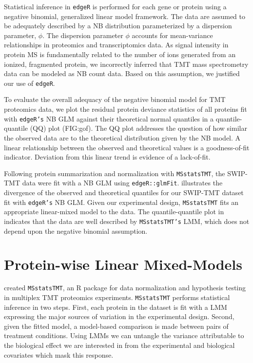 \documentclass[11pt]{elife}\usepackage[]{graphicx}\usepackage[]{color}
\begin{document}
Statistical inference in \texttt{edgeR} is performed for each gene or protein
using a negative binomial, generalized linear model framework.  The data are
assumed to be adequately described by a NB distribution parameterized by a
dispersion parameter, $\phi$. The dispersion parameter $\phi$ accounts for
mean-variance relationships in proteomics and transcriptomics data.  As signal
intensity in protein MS is fundamentally related to the number of ions generated
from an ionized, fragmented protein, we incorrectly inferred that TMT mass
spectrometry data can be modeled as NB count data. Based on this assumption, we
justified our use of \texttt{edgeR}.  

To evaluate the overall adequacy of the negative binomial model for TMT
proteomics data, we plot the residual protein deviance statistics of all
proteins fit with \texttt{edgeR's} NB GLM against their theoretical normal
quantiles in a quantile-quantile (QQ) plot (FIG:gof).  The QQ plot addresses the
question of how similar the observed data are to the theoretical distribution
given by the NB model.  A linear relationship between the observed and
theoretical values is a goodness-of-fit indicator.  Deviation from this linear
trend is evidence of a lack-of-fit.

Following protein summarization and normalization with \texttt{MSstatsTMT}, the
SWIP-TMT data were fit with a NB GLM using \texttt{edgeR::glmFit}. 
illustrates the divergence of the observed and theoretical quantiles for our
SWIP-TMT dataset fit with \texttt{edgeR's} NB GLM. Given our experimental
design, \texttt{MSstatsTMT} fits an appropriate linear-mixed model to the data.
The quantile-quantile plot in  indicates that the data are well
described by \texttt{MSstatsTMT's} LMM, which does not depend upon the negative
binomial assumption.


\section{Protein-wise Linear Mixed-Models}

\cite{Huang2020} created \texttt{MSstatsTMT}, an R package for data
normalization and hypothesis testing in multiplex TMT proteomics experiments.
\texttt{MSstatsTMT} performs statistical inference in two steps.
First, each protein in the dataset is fit with a LMM
expressing the major sources of variation in the experimental design.
Second, given the fitted model, a model-based comparison is made between pairs
of treatment conditions. Using LMMs we can untangle the variance
attributable to the biological effect we are interested in from the experimental
and biological covariates which mask this response.
\end{document}
